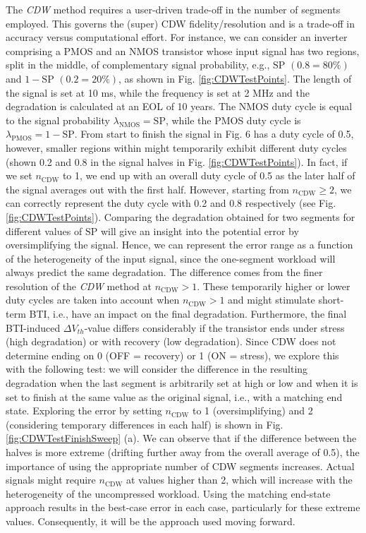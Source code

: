 The \textit{CDW} method requires a user-driven trade-off in the number of segments employed. This governs the (super) CDW fidelity/resolution and is a trade-off in accuracy versus computational effort. For instance, we can consider an inverter comprising a PMOS and an NMOS transistor whose input signal has two regions, split in the middle, of complementary signal probability, e.g., $\text{SP } (0.8 = 80\% )$ and $1-\text{SP } (0.2 = 20\%)$, as shown in Fig. \ref{fig:CDWTestPoints}. The length of the signal is set at 10 ms, while the frequency is set at 2 MHz and the degradation is calculated at an EOL of 10 years. The NMOS duty cycle is equal to the signal probability $\lambda_{\text{NMOS}} = \text{SP}$, while the PMOS duty cycle is $\lambda_{\text{PMOS}} = 1 - \text{SP}$. From start to finish the signal in Fig. 6 has a duty cycle of 0.5, however, smaller regions within might temporarily exhibit different duty cycles (shown 0.2 and 0.8 in the signal halves in Fig. \ref{fig:CDWTestPoints}). In fact, if we set $n_\text{CDW}$ to 1, we end up with an overall duty cycle of 0.5 as the later half of the signal averages out with the first half. However, starting from $n_\text{CDW} \geq 2$, we can correctly represent the duty cycle with 0.2 and 0.8 respectively (see Fig. \ref{fig:CDWTestPoints}). Comparing the degradation obtained for two segments for different values of $\text{SP}$ will give an insight into the potential error by oversimplifying the signal. Hence, we can represent the error range as a function of the heterogeneity of the input signal, since the one-segment workload will always predict the same degradation. The difference comes from the finer resolution of the \textit{CDW} method at $n_\text{CDW} > 1$. These temporarily higher or lower duty cycles are taken into account when $n_\text{CDW} > 1$ and might stimulate short-term BTI, i.e., have an impact on the final degradation. Furthermore, the final BTI-induced $\Delta V_{th}$-value differs considerably if the transistor ends under stress (high degradation) or with recovery (low degradation). Since CDW does not determine ending on 0 (OFF = recovery) or 1 (ON = stress), we explore this with the following test: we will consider the difference in the resulting degradation when the last segment is arbitrarily set at high or low and when it is set to finish at the same value as the original signal, i.e., with a matching end state. Exploring the error by setting $n_\text{CDW}$ to 1 (oversimplifying) and 2 (considering temporary differences in each half) is shown in Fig. \ref{fig:CDWTestFinishSweep} (a). We can observe that if the difference between the halves is more extreme (drifting further away from the overall average of 0.5), the importance of using the appropriate number of CDW segments increases. Actual signals might require $n_\text{CDW}$ at values higher than 2, which will increase with the heterogeneity of the uncompressed workload. Using the matching end-state approach results in the best-case error in each case, particularly for these extreme values. Consequently, it will be the approach used moving forward.


